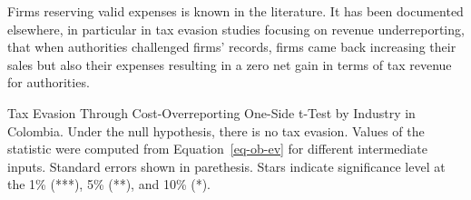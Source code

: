 \documentclass[
  12pt]{article}
\theoremstyle{definition}
\theoremstyle{remark}
\begin{document}
Firms reserving valid expenses is known in the literature. It has been
documented elsewhere, in particular in tax evasion studies focusing on
revenue underreporting, that when authorities challenged firms' records,
firms came back increasing their sales but also their expenses resulting
in a zero net gain in terms of tax revenue for authorities.

\begin{table}

\caption{\label{tbl-evasion-test-CD-gnr}Tax Evasion Through
Cost-Overreporting One-Side t-Test by Industry in Colombia. Under the
null hypothesis, there is no tax evasion. Values of the statistic were
computed from Equation~\ref{eq-ob-ev} for different intermediate inputs.
Standard errors shown in parethesis. Stars indicate significance level
at the 1\% (***), 5\% (**), and 10\% (*).}

\centering{

}
\end{table}
\end{document}
